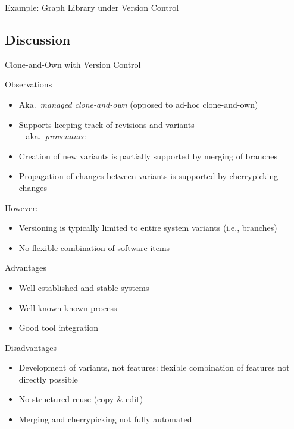 \begin{frame}{Example: Graph Library under Version Control}
	\centering{}
\end{frame}


\subsection{Discussion}

\begin{frame}{Clone-and-Own with Version Control}
	\begin{mycolumns}[widths={60}]
		\begin{note}{Observations}
			\begin{itemize}
				\item Aka.\ \emph{managed clone-and-own} (opposed to ad-hoc clone-and-own)
				\item Supports keeping track of revisions and variants\\-- aka.\ \emph{provenance} 
				\item Creation of new variants is partially supported by merging of branches
				\item Propagation of changes between variants is supported by cherrypicking changes
			\end{itemize}
			However:
			\begin{itemize}
				\item Versioning is typically limited to entire system variants (i.e., branches)
				\item No flexible combination of software items
			\end{itemize}
		\end{note}
	\mynextcolumn
		\begin{note}{Advantages}
			\begin{itemize}
				\item Well-established and stable systems
				\item Well-known known process
				\item Good tool integration	
			\end{itemize}
		\end{note}
		\begin{note}{Disadvantages}
			\begin{itemize}
				\item Development of variants, not features: flexible combination of features not directly possible
				\item No structured reuse (copy \& edit)
				\item Merging and cherrypicking not fully automated
			\end{itemize}	
		\end{note}
	\end{mycolumns}
\end{frame}

